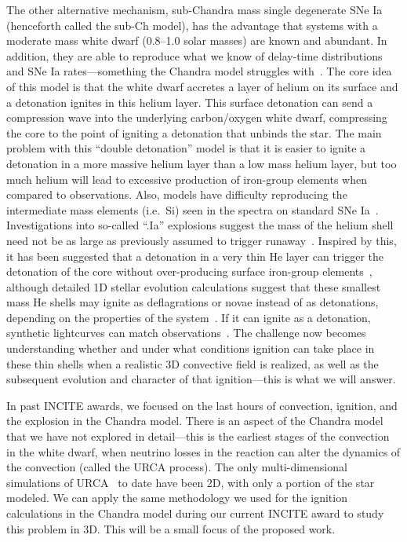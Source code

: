 \documentclass[11pt,letterpaper,english]{article}
\begin{document}
The other alternative mechanism, sub-Chandra mass single degenerate SNe
Ia~\cite{fink:2010,shen:2010,sim:2012} (henceforth called the sub-Ch
model), has the advantage that systems with a moderate mass white dwarf
(0.8--1.0 solar masses) are known and abundant.  In addition, they are
able to reproduce what we know of delay-time distributions and SNe Ia
rates---something the Chandra model struggles with~\cite{ruiter:2011}.
The core idea of this model is that the white dwarf accretes a layer
of helium on its surface and a detonation ignites in this helium
layer.  This surface detonation can send a compression wave into the
underlying carbon/oxygen white dwarf, compressing the core to the point 
of igniting a detonation that unbinds the star. The main
problem with this ``double detonation'' 
model is that it is easier to ignite a detonation in
a more massive helium layer than a low mass helium layer, but too much
helium will lead to excessive production of iron-group elements when
compared to observations. Also, 
models have difficulty reproducing the intermediate mass elements 
(i.e.\ Si) seen in the spectra on standard SNe
Ia~\cite{hoeflich:1996,nugent:1997,kromer:2010}.  
Investigations into 
so-called ``.Ia'' explosions suggest the mass of the helium shell need
not be as large as previously assumed to trigger
runaway~\cite{bildsten:2007}.  Inspired by this, it has been suggested
that a detonation in a very thin He layer can trigger the detonation
of the core without over-producing surface iron-group
elements~\cite{fink:2010}, although detailed 1D stellar evolution
calculations suggest that these smallest mass He shells may ignite as
deflagrations or novae instead of as detonations, depending on the
properties of the system~\cite{woosleykasen:2010}.  If it can ignite
as a detonation, synthetic lightcurves can match
observations~\cite{kromer:2010}.  The challenge now becomes
understanding whether and under what conditions ignition can take
place in these thin shells when a realistic 3D convective field is
realized, as well as the subsequent evolution and character of that
ignition---this is what we will answer.

In past INCITE awards, we focused on the last hours of
convection, ignition, and the explosion in the Chandra model.  There
is an aspect of the Chandra model that we have not explored in
detail---this is the earliest stages of the convection in the white
dwarf, when neutrino losses in the reaction can alter the dynamics of
the convection (called the URCA process).  The only multi-dimensional
simulations of URCA~\cite{URCA} to date have been 2D, with only a
portion of the star modeled.  We can apply the same methodology we
used for the ignition calculations in the Chandra model during our
current INCITE award to study this problem in 3D.  This will be a
small focus of the proposed work.
\end{document}

